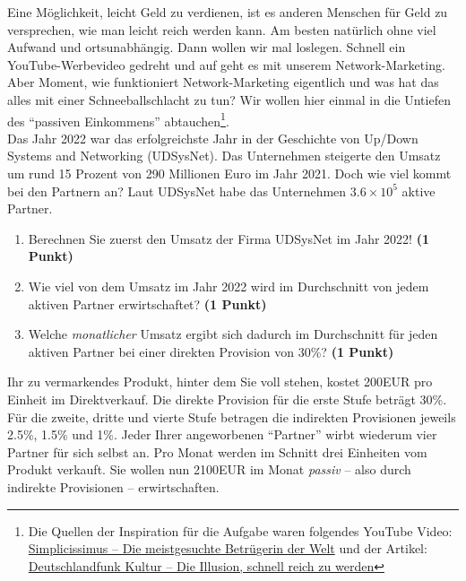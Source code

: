 \documentclass[a4paper, 9pt]{scrartcl}\usepackage[]{graphicx}\usepackage[]{xcolor}
\begin{document}
Eine M{\"o}glichkeit, leicht Geld zu verdienen, ist es anderen Menschen f{\"u}r Geld
zu versprechen, wie man leicht reich werden kann. Am besten nat{\"u}rlich ohne
viel Aufwand und ortsunabh{\"a}ngig. Dann wollen wir mal loslegen. Schnell
ein YouTube-Werbevideo gedreht und auf geht es mit unserem
Network-Marketing. Aber Moment, wie funktioniert Network-Marketing
eigentlich und was hat das alles mit einer Schneeballschlacht zu tun? Wir
wollen hier einmal in die Untiefen des "`passiven Einkommens"'
abtauchen\footnote{Die Quellen der Inspiration f{\"u}r die Aufgabe waren
  folgendes YouTube Video:
  \href{https://youtu.be/UOKkZF_qK9M?si=uf4foJVFKfeQMwSw}{Simplicissimus --
    Die meistgesuchte Betr{\"u}gerin der Welt} und der Artikel:
  \href{https://www.deutschlandfunkkultur.de/netzwerk-marketing-die-illusion-schnell-reich-zu-werden-100.html}{
    Deutschlandfunk Kultur -- Die Illusion, schnell reich zu werden}}.\\

Das Jahr 2022 war das erfolgreichste Jahr in der Geschichte von
Up/Down Systems and Networking (UDSysNet). Das Unternehmen steigerte den Umsatz um rund
15 Prozent von 290 Millionen Euro im Jahr
2021. Doch wie viel kommt bei den Partnern an? Laut
UDSysNet habe das Unternehmen \ensuremath{3.6\times 10^{5}} aktive Partner.

\begin{enumerate}
\item Berechnen Sie zuerst den Umsatz der Firma UDSysNet im
  Jahr 2022! \textbf{(1 Punkt)}
\item Wie viel von dem Umsatz im Jahr 2022 wird im Durchschnitt von jedem
  aktiven Partner erwirtschaftet? \textbf{(1 Punkt)}
\item Welche \textit{monatlicher} Umsatz ergibt sich dadurch im
  Durchschnitt f{\"u}r jeden aktiven Partner bei einer direkten Provision von
  30\%? \textbf{(1 Punkt)}
\end{enumerate}

Ihr zu vermarkendes Produkt, hinter dem Sie voll stehen, kostet
200EUR pro Einheit im Direktverkauf. Die direkte Provision
f{\"u}r die erste Stufe betr{\"a}gt 30\%. F{\"u}r die zweite, dritte und
vierte Stufe betragen die indirekten Provisionen jeweils 2.5\%,
1.5\% und 1\%. Jeder Ihrer angeworbenen "`Partner"'
wirbt wiederum vier Partner f{\"u}r sich selbst an. Pro Monat
werden im Schnitt drei Einheiten vom Produkt verkauft. Sie wollen nun
2100EUR im Monat \textit{passiv} -- also durch indirekte
Provisionen -- erwirtschaften.
\end{document}
